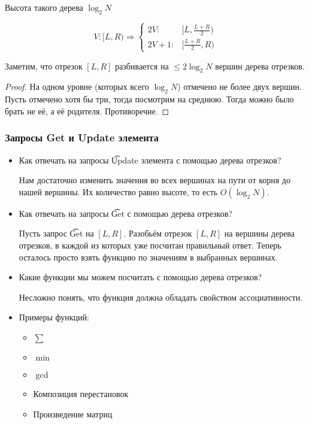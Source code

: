 Высота такого дерева $\log_2 N$

\begin{equation*}
	V: [L, R) \Rightarrow
	\begin{cases}
		2V: & [L, \frac{L+R}{2}) \\
		2V+1: & [\frac{L+R}{2}, R)
	\end{cases}
\end{equation*}

\begin{lemma}
	Заметим, что отрезок $[L, R]$ разбивается на $\le 2\log_2 N$ вершин дерева отрезков.
\end{lemma}

\begin{proof}
	На одном уровне (которых всего $\log_2 N$) отмечено не более двух вершин.
	Пусть отмечено хотя бы три, тогда посмотрим на среднюю.
	Тогда можно было брать не её, а её родителя.
	Противоречие.
\end{proof}

\subsubsection{Запросы Get и Update элемента}

\begin{itemize}
\item
	Как отвечать на запросы \t{Update} элемента с помощью дерева отрезков?

	Нам достаточно изменить значения во всех вершинах на пути от корня до нашей вершины. Их количество равно высоте, то есть $O(\log_2 N)$.

\item
	Как отвечать на запросы \t{Get} с помощью дерева отрезков?

	Пусть запрос \t{Get} на $[L, R]$.
	Разобьём отрезок $[L, R]$ на вершины дерева отрезков, в каждой из которых уже посчитан правильный ответ.
	Теперь осталось просто взять функцию по значениям в выбранных вершинах.

\item
	Какие функции мы можем посчитать с помощью дерева отрезков?
	
	Несложно понять, что функция должна обладать свойством ассоциативности.

\item
	Примеры функций:
	\begin{itemize}
		\item $\sum$
		\item $\min$
		\item $\gcd$
		\item Композиция перестановок
		\item Произведение матриц
	\end{itemize}
\end{itemize}

